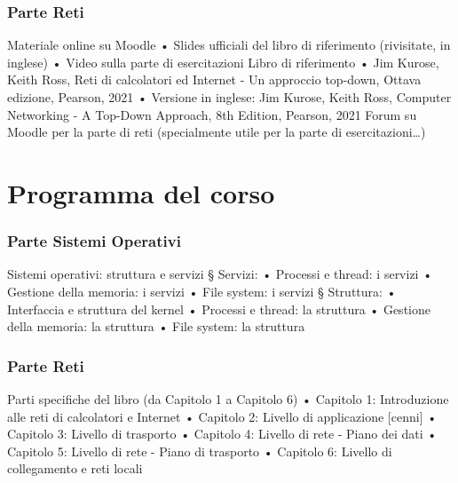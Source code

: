 \subsubsection{Parte Reti}
Materiale online su Moodle
• Slides ufficiali del libro di riferimento (rivisitate, in inglese)
• Video sulla parte di esercitazioni
Libro di riferimento
• Jim Kurose, Keith Ross, Reti di calcolatori ed Internet - Un
approccio top-down, Ottava edizione, Pearson, 2021
• Versione in inglese: Jim Kurose, Keith Ross, Computer
Networking - A Top-Down Approach, 8th Edition, Pearson,
2021
Forum su Moodle per la parte di reti (specialmente utile per la parte di esercitazioni\dots)

\section{Programma del corso}
\subsubsection{Parte Sistemi Operativi}
Sistemi operativi: struttura e servizi
§ Servizi:
• Processi e thread: i servizi
• Gestione della memoria: i servizi
• File system: i servizi
§ Struttura:
• Interfaccia e struttura del kernel
• Processi e thread: la struttura
• Gestione della memoria: la struttura
• File system: la struttura

\subsubsection{Parte Reti}
Parti specifiche del libro (da Capitolo 1 a Capitolo 6)
• Capitolo 1: Introduzione alle reti di calcolatori e Internet
• Capitolo 2: Livello di applicazione [cenni]
• Capitolo 3: Livello di trasporto
• Capitolo 4: Livello di rete - Piano dei dati
• Capitolo 5: Livello di rete - Piano di trasporto
• Capitolo 6: Livello di collegamento e reti locali

